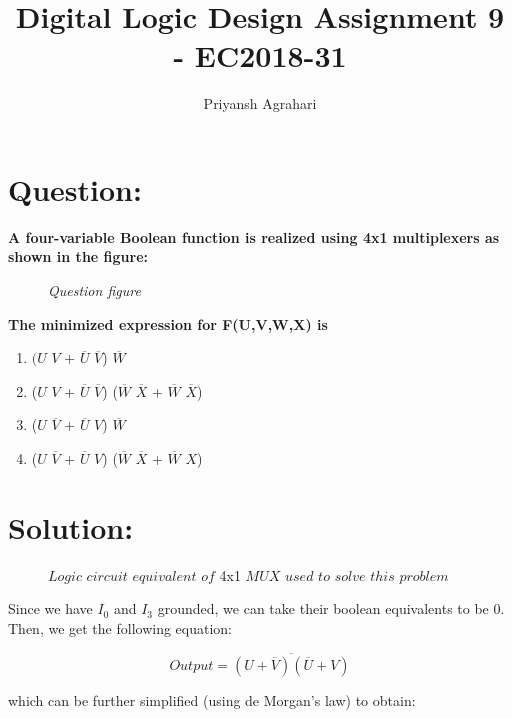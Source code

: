 \documentclass{article}
\title{Digital Logic Design Assignment 9 - EC2018-31}
\author{Priyansh Agrahari}
\begin{document}
\maketitle

\section{Question:}

\textbf{A four-variable Boolean function is realized using 4x1 multiplexers as shown in the figure:}

\begin{figure}[!h]
\centering
\scalebox{0.8}{

}
\caption{\textit{Question figure}}
\label{mux_q}
\end{figure}

\textbf{The minimized expression for F(U,V,W,X) is}

\begin{enumerate}[label=(\Alph*)]
\item $(U$ $V$ + $\overline{U}$  $\overline{V}$) $\overline{W}$
\item ($U$ $V$ + $\overline{U}$ $\overline{V}$) ($\overline{W}$  $\overline{X}$ + $\overline{W}$ $\overline{X}$)
\item ($U$ $\overline{V}$ + $\overline{U}$ $V$) $\overline{W}$
\item ($U$ $\overline{V}$ + $\overline{U}$ $V$) ($\overline{W}$ $\overline{X}$ + $\overline{W}$ $X$)
\end{enumerate}

\section{Solution:}

\begin{figure}[H]
\centering

\caption{$Logic$ $circuit$ $equivalent$ $of$ 4x1 $MUX$ $used$ $to$ $solve$ $this$ $problem$}
\label{mux1}
\end{figure}

Since we have $I_0$ and $I_3$ grounded, we can take their boolean equivalents to be 0. Then, we get the following equation:

\begin{equation}
    Output = \overline{ (U + \overline{V}) (\overline{U} + V) }
\end{equation}

which can be further simplified (using de Morgan's law) to obtain:
\end{document}

